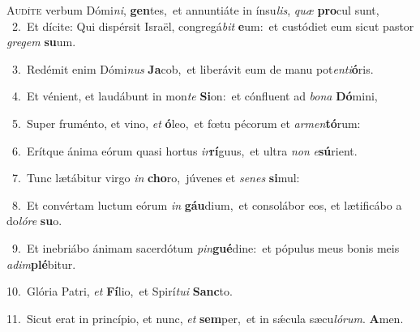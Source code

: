 \lettrine{\initial\textcolor{\initialcolor}{A}}{udíte} verbum Dómi\-\textit{ni}\-, \textbf{gen}\-tes,~\star et annuntiáte in ínsu\-\textit{lis}\-, \textit{quæ} \textbf{pro}\-cul sunt,\\
{\numbfont\textcolor{\numbcolor}{~2.}}~Et dícite: Qui dispérsit Israël, congregá\textit{bit} \textbf{e}\-um:~\star et custódiet eum sicut pastor \textit{gre}\-\textit{gem} \textbf{su}\-um.\par
{\numbfont\textcolor{\numbcolor}{~3.}}~Redémit enim Dómi\textit{nus} \textbf{Ja}\-cob,~\star et liberávit eum de manu pot\-\textit{en}\-\textit{ti}\textbf{ó}ris.\par
{\numbfont\textcolor{\numbcolor}{~4.}}~Et vénient, et laudábunt in mon\textit{te} \textbf{Si}\-on:~\star et cónfluent ad \textit{bo}\-\textit{na} \textbf{Dó}\-mini,\par
{\numbfont\textcolor{\numbcolor}{~5.}}~Super fruménto, et vino, \textit{et} \textbf{ó}\-leo,~\star et fœtu pécorum et \textit{ar}\-\textit{men}\textbf{tó}rum:\par
{\numbfont\textcolor{\numbcolor}{~6.}}~Erítque ánima eórum quasi hortus \textit{ir}\-\textbf{rí}guus,~\star et ultra \textit{non} \textit{e}\-\textbf{sú}rient.\par
{\numbfont\textcolor{\numbcolor}{~7.}}~Tunc lætábitur virgo \textit{in} \textbf{cho}\-ro,~\star júvenes et \textit{se}\-\textit{nes} \textbf{si}\-mul:\par
{\numbfont\textcolor{\numbcolor}{~8.}}~Et convértam luctum eórum \textit{in} \textbf{gáu}\-dium,~\star et consolábor eos, et lætificábo a do\-\textit{ló}\-\textit{re} \textbf{su}\-o.\par
{\numbfont\textcolor{\numbcolor}{~9.}}~Et inebriábo ánimam sacerdótum \textit{pin}\-\textbf{gué}dine:~\star et pópulus meus bonis meis \textit{ad}\-\textit{im}\textbf{plé}bitur.\par
{\numbfont\textcolor{\numbcolor}{10.}}~Glória Patri, \textit{et} \textbf{Fí}\-lio,~\star et Spirí\-\textit{tu}\-\textit{i} \textbf{Sanc}\-to.\par
{\numbfont\textcolor{\numbcolor}{11.}}~Sicut erat in princípio, et nunc, \textit{et} \textbf{sem}\-per,~\star et in sǽcula sæcu\-\textit{ló}\-\textit{rum}. \textbf{A}\-men.\par
